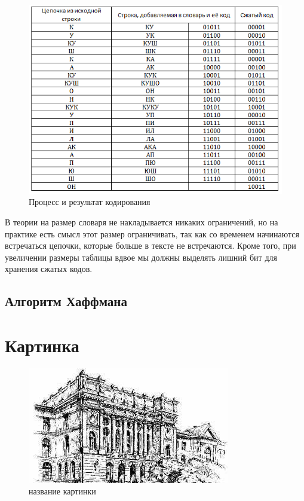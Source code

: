 \begin{figure}[H]
	\begin{center}
		\includegraphics[scale=1]{pics/LZW/result.png}
		\caption{Процесс и результат кодирования}
		\label{pic:lzw:result}
	\end{center}
\end{figure}

В теории на размер словаря не накладывается никаких ограничений, но на практике есть смысл этот размер ограничивать, так как со временем начинаются встречаться цепочки, которые больше в тексте не встречаются. Кроме того, при увеличении размеры таблицы вдвое мы должны выделять лишний бит для хранения сжатых кодов.
  
\subsection*{Алгоритм Хаффмана}

\section*{Картинка}

\begin{figure}[H]
	\begin{center}
		\includegraphics[scale=0.7]{pics/spbpu.jpg}
		\caption{название картинки} 
		\label{pic:pic_name} %
	\end{center}
\end{figure}

